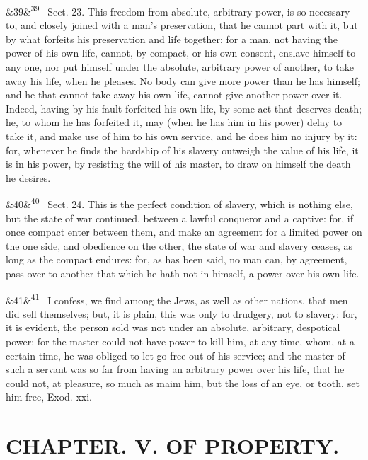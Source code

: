 \documentclass[12pt]{article}
\newcommand{\para}[1][]{\par\noindent\ifx&#1&\else\textsuperscript{\footnotesize #1}~\fi}
\begin{document}
\para[39] Sect. 23. This freedom from absolute, arbitrary power, is so necessary to, and closely joined with a man's preservation, that he cannot part with it, but by what forfeits his preservation and life together: for a man, not having the power of his own life, cannot, by compact, or his own consent, enslave himself to any one, nor put himself under the absolute, arbitrary power of another, to take away his life, when he pleases. No body can give more power than he has himself; and he that cannot take away his own life, cannot give another power over it. Indeed, having by his fault forfeited his own life, by some act that deserves death; he, to whom he has forfeited it, may (when he has him in his power) delay to take it, and make use of him to his own service, and he does him no injury by it: for, whenever he finds the hardship of his slavery outweigh the value of his life, it is in his power, by resisting the will of his master, to draw on himself the death he desires.

\para[40] Sect. 24. This is the perfect condition of slavery, which is nothing else, but the state of war continued, between a lawful conqueror and a captive: for, if once compact enter between them, and make an agreement for a limited power on the one side, and obedience on the other, the state of war and slavery ceases, as long as the compact endures: for, as has been said, no man can, by agreement, pass over to another that which he hath not in himself, a power over his own life.

\para[41] I confess, we find among the Jews, as well as other nations, that men did sell themselves; but, it is plain, this was only to drudgery, not to slavery: for, it is evident, the person sold was not under an absolute, arbitrary, despotical power: for the master could not have power to kill him, at any time, whom, at a certain time, he was obliged to let go free out of his service; and the master of such a servant was so far from having an arbitrary power over his life, that he could not, at pleasure, so much as maim him, but the loss of an eye, or tooth, set him free, Exod. xxi.

\section*{CHAPTER. V. OF PROPERTY.}
\end{document}
